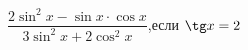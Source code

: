 \begin{ex}[type=calculate_expression]
	\begin{condition}
		\( \dfrac{2\sin^2x-\sin x\cdot\cos x}{3\sin^2x+2\cos^2x} \),\quad если \( \tg x = 2 \)
	\end{condition}
\end{ex}